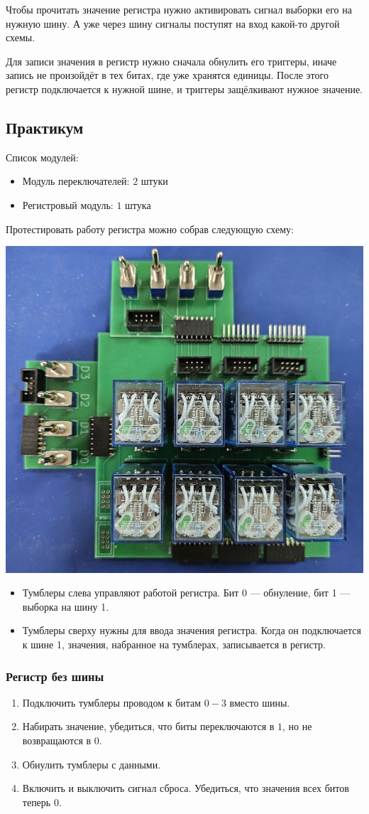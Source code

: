Чтобы прочитать значение регистра нужно активировать сигнал выборки
его на нужную шину. А уже через шину сигналы поступят на вход какой-то
другой схемы.

Для записи значения в регистр нужно сначала обнулить его триггеры,
иначе запись не произойдёт в тех битах, где уже хранятся единицы.
После этого регистр подключается к нужной шине, и триггеры
защёлкивают нужное значение.

\subsection{Практикум}


Список модулей:
\begin{itemize}
    \item Модуль переключателей: $2$ штуки
    \item Регистровый модуль: $1$ штука
\end{itemize}

Протестировать работу регистра можно собрав следующую схему:

\includegraphics[width=0.5\columnwidth]{photo/register.jpg}

\begin{itemize}
  \item Тумблеры слева управляют работой регистра. Бит 0 --- обнуление, бит 1 --- выборка на шину 1.
  \item Тумблеры сверху нужны для ввода значения регистра. Когда он подключается к шине 1,
        значения, набранное на тумблерах, записывается в регистр.
\end{itemize}

\subsubsection{Регистр без шины}

\begin{enumerate}
    \item Подключить тумблеры проводом к битам $0-3$ вместо шины.
    \item Набирать значение, убедиться, что биты переключаются в $1$, но не возвращаются в $0$.
    \item Обнулить тумблеры с данными.
    \item Включить и выключить сигнал сброса. Убедиться, что значения всех битов теперь $0$.
\end{enumerate}

